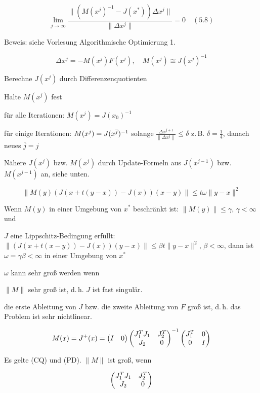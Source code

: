 \[ \lim_{j \to \infty} \frac{\| (M(x^j)^{-1} - J(x^*)) \Delta x^j \|}{\|\Delta x^j\|} = 0 \quad (5.8) \]

Beweis: siehe Vorlesung Algorithmische Optimierung 1.


\[ \Delta x^j = -M(x^j) F(x^j), \quad M(x^j) \cong J(x^j)^{-1} \]

\bitm
\item Berechne $J(x^j)$ durch Differenzenquotienten
\item Halte $M(x^j)$ fest
\bitm
	\item für alle Iterationen: $M(x^j) = J(x_0)^{-1}$
	\item für einige Iterationen: $M(x^j) = J(x^{\overline j})^{-1}$ solange $\frac{\Delta x^{j+1}}{\|\Delta x^j\|} \leq \delta$ z.\,B. $\delta = \frac 14$, danach neues $\overline j = j$ 
\eitm
\item Nähere $J(x^j)$ bzw. $M(x^j)$ durch Update-Formeln aus $J(x^{j-1})$ bzw. $M(x^{j-1})$ an, siehe unten.
\eitm


\[ \| M(y) (J(x+t(y-x)) - J(x)) (x-y) \| \leq t \omega \|y-x\|^2 \]

\bitm
\item Wenn $M(y)$ in einer Umgebung von $x^*$ beschränkt ist: $\|M(y)\| \leq \gamma$, $\gamma < \infty$ und
\item $J$ eine Lippschitz-Bedingung erfüllt: $\|(J(x+t(x-y))-J(x)) (y-x)\| \leq \beta t \|y-x\|^2$, $\beta < \infty$, dann ist $\omega = \gamma \beta < \infty$ in einer Umgebung von $x^*$
\eitm

$\omega$ kann sehr groß werden wenn

\bitm
\item $\|M\|$ sehr groß ist, d.\,h. $J$ ist fast singulär.
\item die erste Ableitung von $J$ bzw. die zweite Ableitung von $F$ groß ist, d.\,h. das Problem ist sehr nichtlinear.
\eitm


\[ M(x) = J^+(x) = \begin{pmatrix} I & 0 \end{pmatrix} \begin{pmatrix} J_1^T J_1 & J_2^T \\ J_2 & 0 \end{pmatrix}^{-1} \begin{pmatrix} J_1^T & 0 \\ 0 & I \end{pmatrix} \]

Es gelte (CQ) und (PD). $\|M\|$ ist groß, wenn

\[ \begin{pmatrix} J_1^T J_1 & J_2^T \\ J_2 & 0 \end{pmatrix} \]

